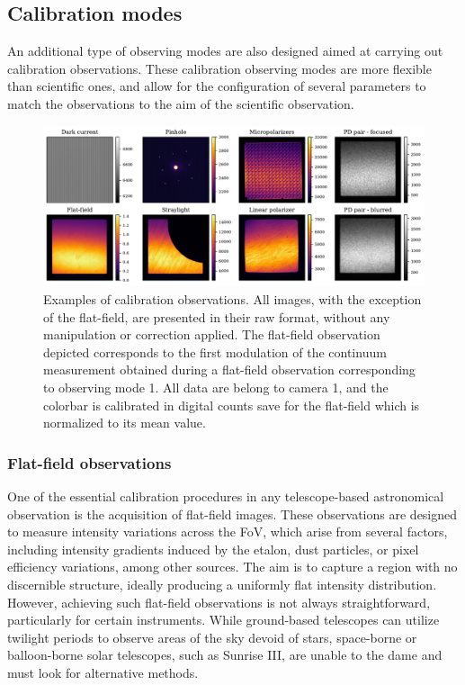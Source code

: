 \subsection{Calibration modes}
An additional type of observing modes are also designed aimed at carrying out calibration observations. These calibration observing modes are more flexible than scientific ones, and allow for the configuration of several parameters to match the observations to the aim of the scientific observation. 

\begin{figure}[t]
    \includegraphics[width=\textwidth]{figures/Pipeline/cal_modes_examples.pdf}
    \caption{
      Examples of calibration observations. All images, with the exception of the flat-field, are presented in their raw format, without any manipulation or correction applied. The flat-field observation depicted corresponds to the first modulation of the continuum measurement obtained during a flat-field observation corresponding to observing mode 1. All data are belong to camera 1, and the colorbar is calibrated in digital counts save for the flat-field which is normalized to its mean value. }
      \label{fig_pipeline: cal_examples}
\end{figure}

\subsubsection{Flat-field observations}

One of the essential calibration procedures in any telescope-based astronomical observation is the acquisition of flat-field images. These observations are designed to measure intensity variations across the FoV, which arise from several factors, including intensity gradients induced by the etalon, dust particles, or pixel efficiency variations, among other sources. The aim is to capture a region with no discernible structure, ideally producing a uniformly flat intensity distribution. However, achieving such flat-field observations is not always straightforward, particularly for certain instruments. While ground-based telescopes can utilize twilight periods to observe areas of the sky devoid of stars, space-borne or balloon-borne solar telescopes, such as Sunrise III, are unable to the dame and must look for alternative methods. 

